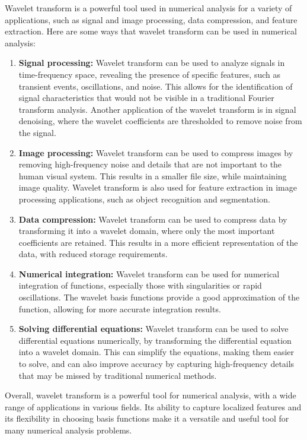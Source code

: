 \documentclass{article}
\begin{document}
Wavelet transform is a powerful tool used in numerical analysis for a variety of applications, such as signal and image processing, data compression, and feature extraction. Here are some ways that wavelet transform can be used in numerical analysis:
\begin{enumerate}

\item \textbf{Signal processing:}  Wavelet transform can be used to analyze signals in time-frequency space, revealing the presence of specific features, such as transient events, oscillations, and noise. This allows for the identification of signal characteristics that would not be visible in a traditional Fourier transform analysis. Another application of the wavelet transform is in signal denoising, where the wavelet coefficients are thresholded to remove noise from the signal.

\item \textbf{Image processing: } Wavelet transform can be used to compress images by removing high-frequency noise and details that are not important to the human visual system. This results in a smaller file size, while maintaining image quality. Wavelet transform is also used for feature extraction in image processing applications, such as object recognition and segmentation.

\item \textbf{Data compression:}  Wavelet transform can be used to compress data by transforming it into a wavelet domain, where only the most important coefficients are retained. This results in a more efficient representation of the data, with reduced storage requirements.

\item \textbf{Numerical integration:}  Wavelet transform can be used for numerical integration of functions, especially those with singularities or rapid oscillations. The wavelet basis functions provide a good approximation of the function, allowing for more accurate integration results.

\item \textbf{Solving differential equations:}  Wavelet transform can be used to solve differential equations numerically, by transforming the differential equation into a wavelet domain. This can simplify the equations, making them easier to solve, and can also improve accuracy by capturing high-frequency details that may be missed by traditional numerical methods.
\end{enumerate}
Overall, wavelet transform is a powerful tool for numerical analysis, with a wide range of applications in various fields. Its ability to capture localized features and its flexibility in choosing basis functions make it a versatile and useful tool for many numerical analysis problems.
\end{document}
